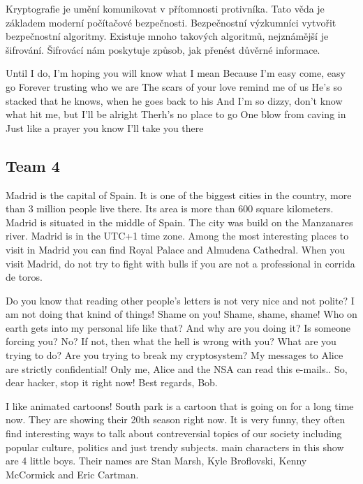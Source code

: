 \documentclass[a4paper,11pt]{article}
\begin{document}
\begin{displayquote}
Kryptografie je umění komunikovat v přítomnosti protivníka. Tato věda je základem moderní počítačové bezpečnosti. Bezpečnostní výzkumníci vytvořit bezpečnostní algoritmy. Existuje mnoho takových algoritmů, nejznámější je šifrování. Šifrovácí nám poskytuje způsob, jak přenést důvěrné informace.
\end{displayquote}

\begin{displayquote}
Until I do, I'm hoping you will know what I mean
Because I'm easy come, easy go
Forever trusting who we are
The scars of your love remind me of us
He's so stacked that he knows, when he goes back to his
And I'm so dizzy, don't know what hit me, but I'll be alright
Therh's no place to go
One blow from caving in
Just like a prayer you know I'll take you there
\end{displayquote}

\newpage
\subsection{Team 4}
\begin{displayquote}
Madrid is the capital of Spain. It is one of the biggest cities in the country,
more than 3 million people live there. Its area is more than 600 square kilometers.
Madrid is situated in the middle of Spain. The city was build on the Manzanares river.
Madrid is in the UTC+1 time zone.
Among the most interesting places to visit in Madrid you can find
Royal Palace and Almudena Cathedral.
When you visit Madrid, do not try to fight with bulls if you are not a professional in corrida de toros.
\end{displayquote}

\begin{displayquote}
Do you know that reading other people's letters is not very nice and not polite?
I am not doing that knind of things! Shame on you! Shame, shame, shame!
Who on earth gets into my personal life like that? And why are you doing it?
Is someone forcing you? No? If not, then what the hell is wrong with you?
What are you trying to do? Are you trying to break my cryptosystem?
My messages to Alice are strictly confidential! Only me, Alice and the NSA can read this e-mails..
So, dear hacker, stop it right now!
Best regards,
Bob.
\end{displayquote}

\begin{displayquote}
I like animated cartoons!
South park is a cartoon that is going on for a long time now. They are showing their 20th season right now.
It is very funny, they often find interesting ways to talk about contreversial topics of our society
including popular culture, politics and just trendy subjects.
main characters in this show are 4 little boys. Their names are
Stan Marsh, Kyle Broflovski, Kenny McCormick and Eric Cartman.
\end{displayquote}
\end{document}
